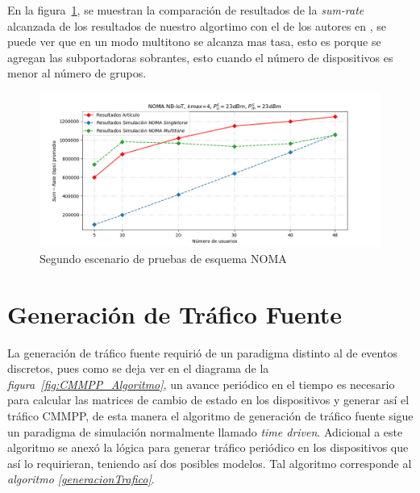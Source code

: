 En la figura~\ref{fig:ResultsNOMA2}, se muestran la comparación de resultados de la \textit{sum-rate} alcanzada de los resultados de nuestro algortimo con el de los autores en \parencite{Shahini2019}, se puede ver que en un modo multitono se alcanza mas tasa, esto es porque se agregan las subportadoras sobrantes, esto cuando el número de dispositivos es menor al número de grupos.
\begin{figure}[th]
    \centering
    \includegraphics[scale=.7]{Figures/NOMA_sumrate.png}
    \decoRule
    \caption[Segundo escenario de pruebas de esquema NOMA]{Segundo escenario de pruebas de esquema NOMA}
    \label{fig:ResultsNOMA2}
\end{figure}

\break


\section{Generación de Tráfico Fuente}
La generación de tráfico fuente requirió de un paradigma distinto al de eventos discretos, pues como se deja ver en el diagrama de la \textit{figura~\ref{fig:CMMPP_Algoritmo}}, un avance periódico en el tiempo es necesario para calcular las matrices de cambio de estado en los dispositivos y generar así el tráfico CMMPP, de esta manera el algoritmo de generación de tráfico fuente sigue un paradigma de simulación normalmente llamado \textit{time driven}. Adicional a este algoritmo se anexó la lógica para generar tráfico periódico en los dispositivos que así lo requirieran, teniendo así dos posibles modelos. Tal algoritmo corresponde al \textit{algoritmo \ref{generacionTrafico}}. \newline


